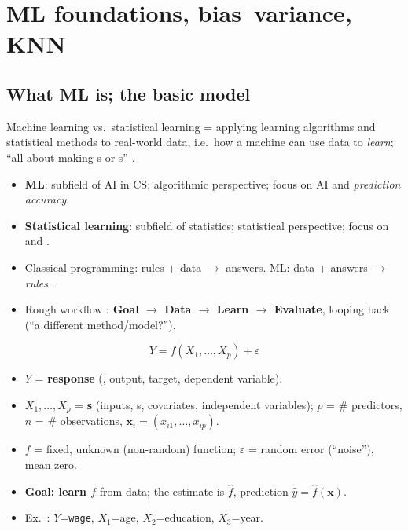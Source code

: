 \section{ML foundations, bias--variance, KNN}

\subsection{What ML is; the basic model}

\begin{topic}{Machine learning vs.\ statistical learning }
 = applying learning algorithms and statistical methods to real-world data, i.e.\ how a machine can use data to \emph{learn}; ``all about making s or s'' .
\begin{itemize}
\item \textbf{ML}: subfield of AI in CS; algorithmic perspective; focus on AI and \emph{prediction accuracy}.
\item \textbf{Statistical learning}: subfield of statistics; statistical perspective; focus on  and  .
\item Classical programming: rules + data $\to$ answers. ML: data + answers $\to$ \emph{rules} .
\item Rough workflow : \textbf{Goal $\to$ Data $\to$ Learn $\to$ Evaluate}, looping back (``a different method/model?'').
\end{itemize}
\end{topic}

\begin{keybox}
\[ Y = f(X_1,\dots,X_p) + \varepsilon \]
\begin{itemize}
\item $Y$ = \textbf{response} (, output, target, dependent variable).
\item $X_1,\dots,X_p$ = \textbf{s} (inputs, s, covariates, independent variables); $p$ = \# predictors, $n$ = \# observations, $\mathbf x_i=(x_{i1},\dots,x_{ip})$.
\item $f$ = fixed, unknown (non-random) function; $\varepsilon$ = random error (``noise''), mean zero.
\item \textbf{Goal: learn $f$} from data; the estimate is $\hat f$, prediction $\hat y=\hat f(\mathbf x)$.
\item Ex.\ : $Y$=\texttt{wage}, $X_1$=age, $X_2$=education, $X_3$=year.
\end{itemize}
\end{keybox}

